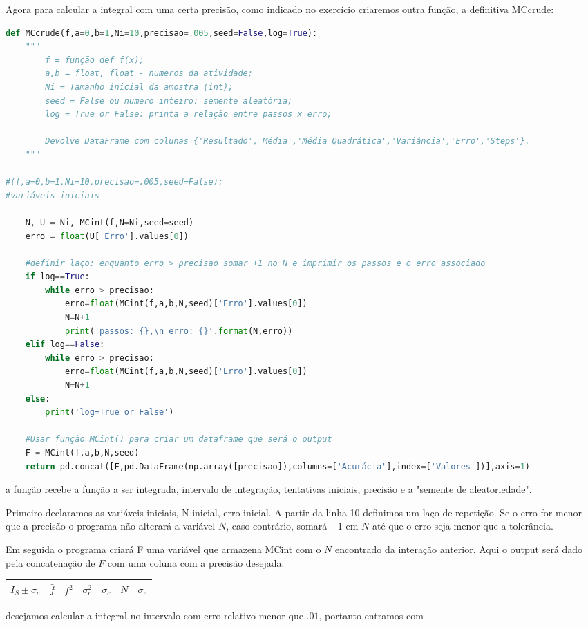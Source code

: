 \documentclass{article}
\begin{document}
Agora para calcular a integral com uma certa precisão, como indicado no exercício criaremos outra função, a definitiva MCcrude:
\begin{lstlisting}[language=Python]
def MCcrude(f,a=0,b=1,Ni=10,precisao=.005,seed=False,log=True):
	"""
		f = função def f(x);
		a,b = float, float - numeros da atividade;
		Ni = Tamanho inicial da amostra (int);
		seed = False ou numero inteiro: semente aleatória;
		log = True or False: printa a relação entre passos x erro;

		Devolve DataFrame com colunas {'Resultado','Média','Média Quadrática','Variância','Erro','Steps'}.
	"""

#(f,a=0,b=1,Ni=10,precisao=.005,seed=False):
#variáveis iniciais

	N, U = Ni, MCint(f,N=Ni,seed=seed)
	erro = float(U['Erro'].values[0])

	#definir laço: enquanto erro > precisao somar +1 no N e imprimir os passos e o erro associado
	if log==True:
		while erro > precisao:
			erro=float(MCint(f,a,b,N,seed)['Erro'].values[0])
			N=N+1
			print('passos: {},\n erro: {}'.format(N,erro))
	elif log==False:
		while erro > precisao:
			erro=float(MCint(f,a,b,N,seed)['Erro'].values[0])
			N=N+1
	else:
		print('log=True or False')

	#Usar função MCint() para criar um dataframe que será o output
	F = MCint(f,a,b,N,seed)
	return pd.concat([F,pd.DataFrame(np.array([precisao]),columns=['Acurácia'],index=['Valores'])],axis=1)
\end{lstlisting}
a função recebe a função a ser integrada, intervalo de integração, tentativas iniciais, precisão e a "semente de aleatoriedade".

Primeiro declaramos as variáveis iniciais, N inicial, erro inicial. A partir da linha 10 definimos um laço de repetição. Se o erro for menor que a precisão o programa não alterará a variável $N$, caso contrário, somará $+1$ em $N$ até que o erro seja menor que a tolerância.

Em seguida o programa criará F uma variável que armazena MCint com o $N$ encontrado da interação anterior. Aqui o output será dado pela concatenação de $F$ com uma coluna com a precisão desejada:
\begin{table}[h!]
    \centering
    \begin{tabular}{|c|c|c|c|c|c|c|}
    \hline
    $I_S\pm \sigma_c$ & $\bar{f}$&$\overline{f^2}$&$\sigma_c^2$&$\sigma_c$&$N$&$\sigma_{e}$\\
    \hline
\end{tabular}
\end{table}
desejamos calcular a integral no intervalo com erro relativo menor que $.01$, portanto entramos com 
\end{document}
